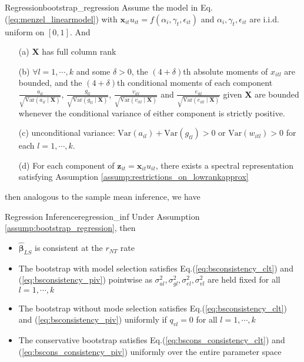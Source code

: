 \documentclass[twoside]{article}
\begin{document}
\begin{assumption}{Regression}{bootstrap_regression}
    Assume the model in Eq.(\ref{eq:menzel_linearmodel}) with $\mathbf{x}_{it}u_{it}=f(\alpha_i,\gamma_t,\epsilon_{it})$ and $\alpha_i,\gamma_t,\epsilon_{it}$ are i.i.d. uniform on $[0,1]$. And 
    \begin{itemize}
        \item[(a)] $\mathbf{X}$ has full column rank
        \item[(b)] $\forall l=1,\cdots,k$ and some $\delta>0$, the $(4+\delta)$th absolute moments of $x_{itl}$ are bounded, and the $(4+\delta)$th conditional moments of each component $\frac{a_{il}}{\sqrt{\mathrm{Var}\left(a_{il}\mid\mathbf{X}\right)}}$, $\frac{g_{tl}}{\sqrt{\mathrm{Var}\left(g_{tl}\mid\mathbf{X}\right)}}$, $\frac{v_{itl}}{\sqrt{\mathrm{Var}\left(v_{itl}\mid\mathbf{X}\right)}}$ and $\frac{e_{itl}}{\sqrt{\mathrm{Var}\left(e_{itl}\mid\mathbf{X}\right)}}$ given $\mathbf{X}$ are bounded whenever the conditional variance of either component is strictly positive.
        \item[(c)] unconditional variance: $\mathrm{Var}(a_{il}) + \mathrm{Var}(g_{tl})>0$ or $\mathrm{Var}\left(w_{itl}\right)>0$ for each $l=1,\cdots,k$.
        \item[(d)] For each component of $\mathbf{z}_{it}=\mathbf{x}_{it}u_{it}$, there exists a spectral representation satisfying Assumption \ref{assump:restrictions_on_lowrankapprox} 
    \end{itemize}
\end{assumption}
then analogous to the sample mean inference, we have 
\begin{proposition}{Regression Inference}{regression_inf}
    Under Assumption \ref{assump:bootstrap_regression}, then 
    \begin{itemize}
        \item $\hat{\boldsymbol{\beta}}_{LS}$ is consistent at the $r_{NT}$ rate 
        \item The bootstrap with model selection satisfies Eq.(\ref{eq:bsconsistency_clt}) and (\ref{eq:bsconsistency_piv}) pointwise as $\sigma^2_{al},\sigma^2_{gl},\sigma^2_{el},\sigma^2_{vl}$ are held fixed for all $l=1,\cdots,k$
        \item The bootstrap without mode selection satisfies Eq.(\ref{eq:bsconsistency_clt}) and (\ref{eq:bsconsistency_piv}) uniformly if $q_{vl}=0$ for all $l=1,\cdots,k$
        \item The conservative bootstrap satisfies Eq.(\ref{eq:bscons_consistency_clt}) and (\ref{eq:bscons_consistency_piv}) uniformly over the entire parameter space
    \end{itemize}
\end{proposition}
\end{document}
